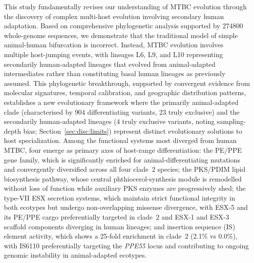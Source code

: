 \documentclass[11pt,a4paper]{article}
\begin{document}
This study fundamentally revises our understanding of MTBC evolution through
the discovery of complex multi-host evolution involving secondary human
adaptation. Based on comprehensive phylogenetic analysis supported by
\num{274800} whole-genome sequences, we demonstrate that the traditional
model of simple animal-human bifurcation is incorrect. Instead, MTBC evolution
involves multiple host-jumping events, with lineages L6, L9, and L10 representing
secondarily human-adapted lineages that evolved from animal-adapted intermediates
rather than constituting basal human lineages as previously assumed.
%
This phylogenetic breakthrough, supported by convergent evidence from molecular
signatures, temporal calibration, and geographic distribution patterns,
establishes a new evolutionary framework where the primarily animal-adapted
clade (characterised by 904 differentiating variants, 23 truly exclusive) and the
secondarily human-adapted lineages (4 truly exclusive variants,
noting sampling-depth bias; Section~\ref{sec:disc:limits})
represent distinct evolutionary solutions to host specialization.
%
Among the functional systems most diverged from human MTBC, four emerge as
primary axes of host-range differentiation: the PE/PPE gene family, which is
significantly enriched for animal-differentiating mutations and convergently diversified
across all four clade~2 species; the PKS/PDIM lipid biosynthesis pathway,
whose central phthiocerol-synthesis module is remodelled without loss of function
while auxiliary PKS enzymes are progressively shed; the type-VII ESX
secretion systems, which maintain strict functional integrity in both ecotypes
but undergo non-overlapping missense divergence, with ESX-5 and its PE/PPE cargo
preferentially targeted in clade~2 and ESX-1 and ESX-3 scaffold
components diverging in human lineages; and insertion sequence (IS) element
activity, which shows a 25-fold enrichment in clade~2 (2.1\% vs 0.0\%),
with IS6110 preferentially targeting the \textit{PPE55} locus and contributing
to ongoing genomic instability in animal-adapted ecotypes.
\end{document}
